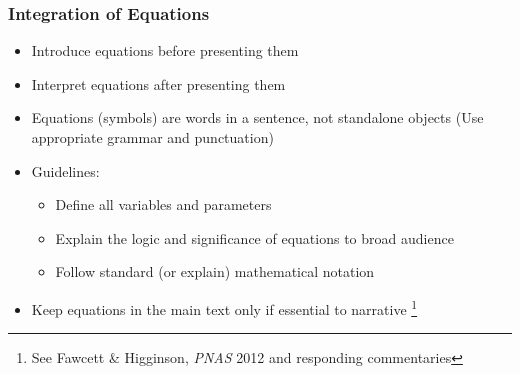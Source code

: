 \documentclass{beamer}
\begin{document}
\begin{frame}
  \frametitle{Integration of Equations}
  \begin{itemize}
    \item Introduce equations before presenting them
    \item Interpret equations after presenting them
    \item Equations (symbols) are words in a sentence, not standalone objects
    {\footnotesize(Use appropriate grammar and punctuation)}
    \item Guidelines:
    \begin{itemize}
      \item Define all variables and parameters
      \item Explain the logic and significance of equations to broad audience
      \item Follow standard (or explain) mathematical notation
    \end{itemize}
    \item Keep equations in the main text only if essential to narrative%
    \footnote{See Fawcett \& Higginson, \emph{PNAS} 2012 and responding commentaries}
  \end{itemize}
\end{frame}
\end{document}
